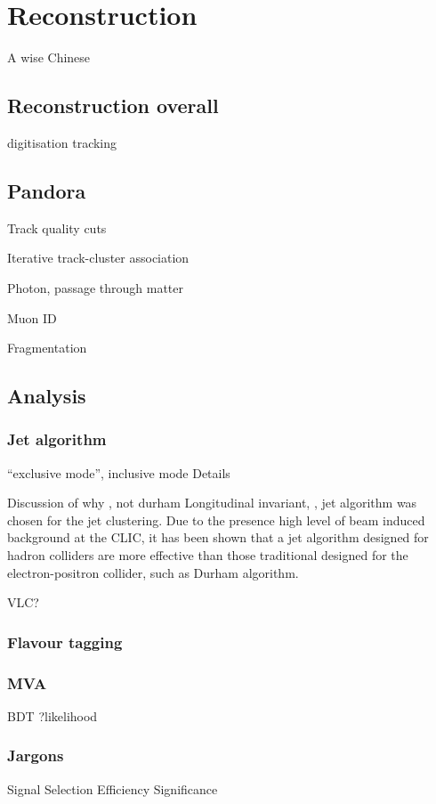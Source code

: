 \chapter{Reconstruction}
\label{chap:Reconstruction}

%
{A wise Chinese}%


\section{Reconstruction overall}
digitisation
tracking

\section{Pandora}

Track quality cuts

Iterative track-cluster association

Photon, passage through matter

Muon ID

Fragmentation

\section{Analysis}

\subsection{Jet algorithm}

``exclusive mode'', inclusive mode
Details

Discussion of why \kt, not durham
Longitudinal invariant, \kt, jet algorithm was chosen for the jet clustering. Due to the presence high level of beam induced background at the CLIC, it has been shown that a jet algorithm designed for hadron colliders are more effective than those traditional designed for the electron-positron collider, such as Durham algorithm.\cite{}

VLC?

\subsection{Flavour tagging}

\subsection{MVA}

BDT
?likelihood

\subsection{Jargons}
Signal
Selection
Efficiency
Significance
